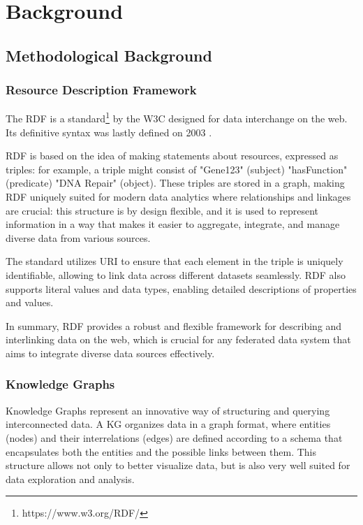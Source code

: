 
\chapter{Background}
\label{chp:background}

\section{Methodological Background}
\subsection{Resource Description Framework}
The \ac{RDF} is a standard\footnote{https://www.w3.org/RDF/} by the \ac{W3C} designed for data interchange on the web. Its definitive syntax was lastly defined on 2003 \cite{beckett2004rdf}.

\ac{RDF} is based on the idea of making statements about resources, expressed as triples: for example, a triple might consist of "Gene123" (subject) "hasFunction" (predicate) "DNA Repair" (object). These triples are stored in a graph, making \ac{RDF} uniquely suited for modern data analytics where relationships and linkages are crucial: this structure is by design flexible, and it is used to represent information in a way that makes it easier to aggregate, integrate, and manage diverse data from various sources.

The standard utilizes \ac{URI} to ensure that each element in the triple is uniquely identifiable, allowing to link data across different datasets seamlessly. \ac{RDF} also supports literal values and data types, enabling detailed descriptions of properties and values.

In summary, \ac{RDF} provides a robust and flexible framework for describing and interlinking data on the web, which is crucial for any federated data system that aims to integrate diverse data sources effectively.

\subsection{Knowledge Graphs}
Knowledge Graphs represent an innovative way of structuring and querying interconnected data. A \ac{KG} organizes data in a graph format, where entities (nodes) and their interrelations (edges) are defined according to a schema that encapsulates both the entities and the possible links between them. This structure allows not only to better visualize data, but is also very well suited for data exploration and analysis.

